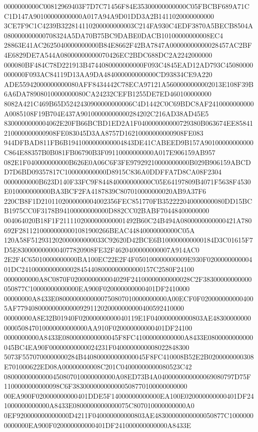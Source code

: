 \documentclass[UTF8,fontset=fandol,zihao=-4,a4paper]{ctexart}
\begin{document}
{{0000000000C00812969403F7D7C71456F84E35300000000000C05FBCBF689A71CC1D147A90100000000000A017A94A9D01DD3A2B1411020000000000
3CE7F9C1C4239B322814110200000000003C214FA930C4EDF3870A5BECB8504A080000000000708324A5DA70B75BC9DABE0DACB10100000000008EC4
28863E41AC2625040000000000B84E8662F42BA7847A00000000000028457AC2BF4E6829DE7A544A08000000000070426EC2BDC688DC2A2242000000
000080BF484C78D221913B4744080000000000F093C4845EAD12AD793C45080000000000F093AC84119D13AA9DA484000000000000CD93834CE9A220
ADE55942000000000080AFF8434442C78ECA97121A5600000000002013E108F39B6A6DA78908010000000080CA24232CEFB1255DE7ED460100000000
8082A421C469B65D5242430900000000006C4D1442C0C69BDC8AF2410000000000A0085108F19B704E437A90100000000000284202C216AD38AD45E5
8300000000004062E20FB66BCBD1ED2A1F040000000000729380B063674EE85841210000000000908FE083045D3AA8757D16210000000000908FE083
944DFBAD811FB6B1941000000000004843DE41CABEED9B157A90100000000000C864E88357B0B081FB06790B3F09110000000000A017E906159AB957
082E1F040000000000B626E0A06C6F3FE97929210000000000B029B906159ABCDD7D6BD09357817C100000000000D8915C836A0DDFFA7D8CA08F2304
0000000000B623D140F33FC9F844840000000000C05E64197809B4071F5638F4530E010000000000BA3BCF2FA4187839C807010000000020AB9A37F6
220CB8F1D2101102000000004002356FEC851770FB352222040000000080DD15BCB1975CC0F3178B94100000000000D882CC02BABF70448400000000
004064020B18F1F2111102000000000001492B60C24B494A0800000000000421A780692F28112100000000001081900266BEAC44840000000000C05A
120A58F512931202000000000033C92620D42BCE6B100000000000184D3C01615F7D5E8300000000004077820908FE32F4620400000000007A914AC0
2E2F4C65010000000000BA100EC22E2F4F050100000000009E930F020000000000401DC24100000000000028454408000000000000157C2580F24100
0000000000A8C0870F0200000000004029F24100000000000028C2F38300000000000050877C10000000000000EA900F020000000000401DF2410000
00000000A8433E08000000000000750807010000000000A00ECF0F0200000000004005AF779408000000000000929112020000000000400592410000
00000000A8E32B01940F02000000000040119E1F040000000000803AE48300000000000050847010000000000000AA910F020000000000401DF24100
0000000000A8433E0800000000000045F8FC41000000000000A8433E0800000000000045BC4EA90F00000000000024231F0400000000008022848300
5073F5570700000000284B440800000000000045F8FC410008B52E2B0200000000308E701000622ED08A00000000008C201C04000000000080523C42
08000000000000450807010000000000A08ED73B4A0400000000000069080797D75F1100000000000098C6F383000000000000508770100000000000
00EA900F020000000000401DDE5F14000000000000EA100E020000000000401DF241000000000000A8433E0800000000000075C807010000000000A0
0EF920000000000000D4211F040000000000803AE48300000000000050877C10000000000000EA900F020000000000401DF241000000000000A8433E
}}
\end{document}
